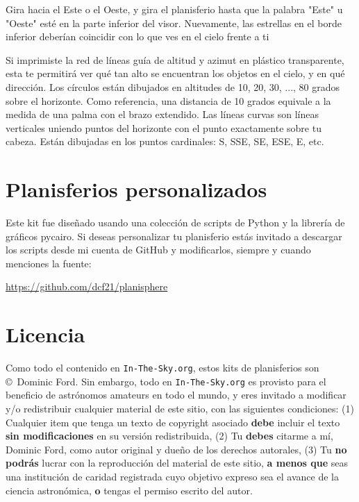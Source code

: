 \documentclass[a4paper,onecolumn,10pt]{article}
\begin{document}
Gira hacia el Este o el Oeste, y gira el planisferio hasta que la palabra "Este" u
"Oeste" esté en la parte inferior del visor. Nuevamente, las estrellas en el borde
inferior deberían coincidir con lo que ves en el cielo frente a ti

Si imprimiste la red de líneas guía de altitud y azimut en plástico transparente,
esta te permitirá ver qué tan alto se encuentran los objetos en el cielo, y en qué
dirección. Los círculos están dibujados en altitudes de 10, 20, 30, ..., 80 grados
sobre el horizonte. Como referencia, una distancia de 10 grados equivale a la
medida de una palma con el brazo extendido. Las líneas curvas son líneas verticales
uniendo puntos del horizonte con el punto exactamente sobre tu cabeza. Están
dibujadas en los puntos cardinales: S, SSE, SE, ESE, E, etc.

\section*{Planisferios personalizados}

Este kit fue diseñado usando una colección de scripts de Python y
la librería de gráficos pycairo. Si deseas personalizar tu planisferio
estás invitado a descargar los scripts desde mi cuenta de GitHub y
modificarlos, siempre y cuando menciones la fuente:

\url{https://github.com/dcf21/planisphere}

\section*{Licencia}

Como todo el contenido en {\tt In-The-Sky.org}, estos kits de planisferios son
\copyright\ Dominic Ford. Sin embargo, todo en {\tt In-The-Sky.org} es provisto
para el beneficio de astrónomos amateurs en todo el mundo, y eres invitado a
modificar y/o redistribuir cualquier material de este sitio, con las siguientes
condiciones: (1) Cualquier item que tenga un texto de copyright asociado {\bf debe}
incluir el texto {\bf sin modificaciones} en su versión redistribuida, (2) Tu
{\bf debes} citarme a mí, Dominic Ford, como autor original y dueño de los derechos
autorales, (3) Tu {\bf no podrás} lucrar con la reproducción del material de este
sitio, {\bf a menos que} seas una institución de caridad registrada cuyo objetivo
expreso sea el avance de la ciencia astronómica, {\bf o} tengas el permiso escrito
del autor.

\newpage
\end{document}
